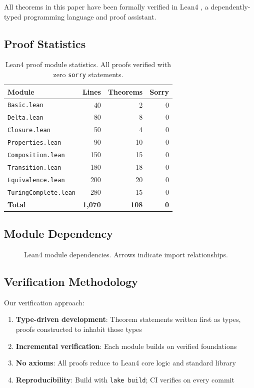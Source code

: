 \documentclass[11pt,letterpaper]{article}
\theoremstyle{plain}
\theoremstyle{definition}
\theoremstyle{remark}
\begin{document}
All theorems in this paper have been formally verified in Lean4 \cite{moura2021lean4}, a dependently-typed programming language and proof assistant.

\subsection{Proof Statistics}

\begin{table}[h]
\centering
\begin{tabular}{lrrr}
\toprule
\textbf{Module} & \textbf{Lines} & \textbf{Theorems} & \textbf{Sorry} \\
\midrule
\texttt{Basic.lean} & 40 & 2 & 0 \\
\texttt{Delta.lean} & 80 & 8 & 0 \\
\texttt{Closure.lean} & 50 & 4 & 0 \\
\texttt{Properties.lean} & 90 & 10 & 0 \\
\texttt{Composition.lean} & 150 & 15 & 0 \\
\texttt{Transition.lean} & 180 & 18 & 0 \\
\texttt{Equivalence.lean} & 200 & 20 & 0 \\
\texttt{TuringComplete.lean} & 280 & 15 & 0 \\
\midrule
\textbf{Total} & \textbf{1,070} & \textbf{108} & \textbf{0} \\
\bottomrule
\end{tabular}
\caption{Lean4 proof module statistics. All proofs verified with zero \texttt{sorry} statements.}
\label{tab:proof-stats}
\end{table}

\subsection{Module Dependency}

\begin{figure}[h]
\centering

\caption{Lean4 module dependencies. Arrows indicate import relationships.}
\label{fig:dependencies}
\end{figure}

\subsection{Verification Methodology}

Our verification approach:

\begin{enumerate}
    \item \textbf{Type-driven development}: Theorem statements written first as types, proofs constructed to inhabit those types
    \item \textbf{Incremental verification}: Each module builds on verified foundations
    \item \textbf{No axioms}: All proofs reduce to Lean4 core logic and standard library
    \item \textbf{Reproducibility}: Build with \texttt{lake build}; CI verifies on every commit
\end{enumerate}
\end{document}
